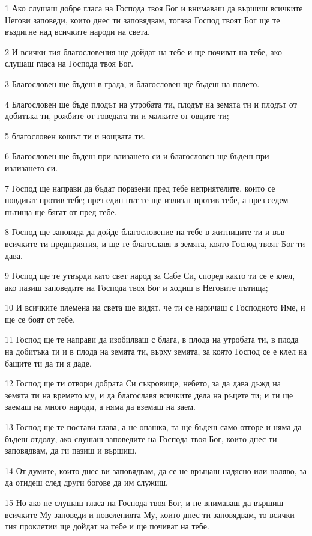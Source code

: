 \par 1 Ако слушаш добре гласа на Господа твоя Бог и внимаваш да вършиш всичките Негови заповеди, които днес ти заповядвам, тогава Господ твоят Бог ще те въздигне над всичките народи на света.
\par 2 И всички тия благословения ще дойдат на тебе и ще почиват на тебе, ако слушаш гласа на Господа твоя Бог.
\par 3 Благословен ще бъдеш в града, и благословен ще бъдеш на полето.
\par 4 Благословен ще бъде плодът на утробата ти, плодът на земята ти и плодът от добитъка ти, рожбите от говедата ти и малките от овците ти;
\par 5 благословен кошът ти и нощвата ти.
\par 6 Благословен ще бъдеш при влизането си и благословен ще бъдеш при излизането си.
\par 7 Господ ще направи да бъдат поразени пред тебе неприятелите, които се повдигат против тебе; през един път те ще излизат против тебе, а през седем пътища ще бягат от пред тебе.
\par 8 Господ ще заповяда да дойде благословение на тебе в житниците ти и във всичките ти предприятия, и ще те благославя в земята, която Господ твоят Бог ти дава.
\par 9 Господ ще те утвърди като свет народ за Сабе Си, според както ти се е клел, ако пазиш заповедите на Господа твоя Бог и ходиш в Неговите пътища;
\par 10 И всичките племена на света ще видят, че ти се наричаш с Господното Име, и ще се боят от тебе.
\par 11 Господ ще те направи да изобилваш с блага, в плода на утробата ти, в плода на добитъка ти и в плода на земята ти, върху земята, за която Господ се е клел на бащите ти да ти я даде.
\par 12 Господ ще ти отвори добрата Си съкровище, небето, за да дава дъжд на земята ти на времето му, и да благославя всичките дела на ръцете ти; и ти ще заемаш на много народи, а няма да вземаш на заем.
\par 13 Господ ще те постави глава, а не опашка, та ще бъдеш само отгоре и няма да бъдеш отдолу, ако слушаш заповедите на Господа твоя Бог, които днес ти заповядвам, да ги пазиш и вършиш.
\par 14 От думите, които днес ви заповядвам, да се не връщаш надясно или наляво, за да отидеш след други богове да им служиш.
\par 15 Но ако не слушаш гласа на Господа твоя Бог, и не внимаваш да вършиш всичките Му заповеди и повеленията Му, които днес ти заповядвам, то всички тия проклетии ще дойдат на тебе и ще почиват на тебе.
